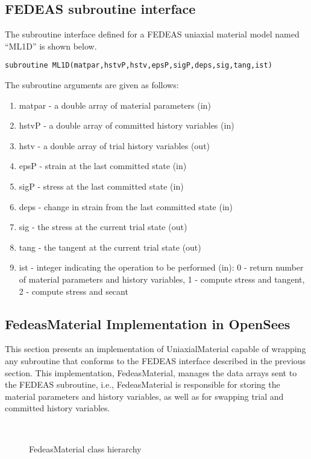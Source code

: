 \documentclass[12pt]{article}
\begin{document}
\subsection{FEDEAS subroutine interface}
The subroutine interface defined for a FEDEAS uniaxial material model named ``ML1D''
is shown below.

{\sf\small
\begin{verbatim}
subroutine ML1D(matpar,hstvP,hstv,epsP,sigP,deps,sig,tang,ist)
\end{verbatim}
}

\noindent The subroutine arguments are given as follows:

\begin{enumerate}
\item{matpar} - a double array of material parameters (in)
\item{hstvP} - a double array of committed history variables (in)
\item{hstv} - a double array of trial history variables (out)
\item{epsP} - strain at the last committed state (in)
\item{sigP} - stress at the last committed state (in)
\item{deps} - change in strain from the last committed state (in)
\item{sig} - the stress at the current trial state (out)
\item{tang} - the tangent at the current trial state (out)
\item{ist} - integer indicating the operation to be performed (in): 0 - return number
of material parameters and history variables, 1 - compute stress and tangent, 2 - compute 
stress and secant
\end{enumerate}

\subsection{FedeasMaterial Implementation in OpenSees}
This section presents an implementation of UniaxialMaterial capable of wrapping any
subroutine that conforms to the FEDEAS interface described in the previous
section. This implementation, FedeasMaterial, manages the data arrays sent to the
FEDEAS subroutine, i.e., FedeasMaterial is responsible for storing the material
parameters and history variables, as well as for swapping trial and committed history
variables.

\begin{figure}[htpb]
\begin{center}
\leavevmode
\hbox{%
}
\end{center}
\caption{FedeasMaterial class hierarchy}
\label{fig:Fedeas}
\end{figure}
\end{document}
